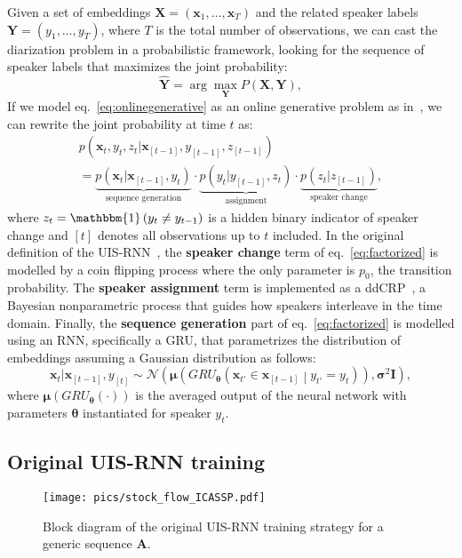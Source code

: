 \documentclass{article}
\def\x{{\mathbf x}}
\def\X{{\mathbf X}}
\def\Y{{\mathbf Y}}
\def\xt1{{\mathbf x}_{\left[t-1\right]}}
\begin{document}
Given a set of embeddings $\X=\left(\x_1,\dots,\x_T\right)$ 
and the related speaker labels $\Y=\left(y_1,\dots,y_T\right)$, where $T$ is the total number of observations, we can cast the diarization problem in a probabilistic framework, looking for the sequence of speaker labels that maximizes the joint probability:
\begin{equation}
\label{eq:onlinegenerative}
    \hat{\Y}=\arg\max_{\Y}P(\X,\Y),
\end{equation}
If we model eq.~\ref{eq:onlinegenerative} as an online generative problem as in~\cite{zhang2019fully}, we can rewrite the joint probability at time $t$ as:
\begin{multline}
\label{eq:factorized}
p(\x_t,y_t,z_t|\xt1,y_{\left[t-1\right]},z_{\left[t-1\right]})\\
=\underbrace{p(\x_t|\xt1,y_t)}_\text{sequence generation}\cdot \underbrace{p(y_t|y_{\left[t-1\right]},z_t)}_\text{assignment} \cdot \underbrace{p(z_t|z_{\left[t-1\right]})}_\text{speaker change},
\end{multline}
where $z_{t}=\mathbbm{1}\left(y_{t} \neq y_{t-1}\right)$ is a hidden binary indicator of speaker change and $\left[t\right]$ denotes all observations up to $t$ included. In the original definition of the UIS-RNN~\cite{zhang2019fully}, the {\bf speaker change} term of eq.~\ref{eq:factorized} is modelled by a coin flipping process where the only parameter is $p_0$, the transition probability. The {\bf speaker assignment} term is implemented as a \ac{ddCRP}~\cite{blei2011distance}, a Bayesian nonparametric process that guides how speakers interleave in the time domain.
Finally, the {\bf sequence generation} part of eq.~\ref{eq:factorized} is modelled using an \ac{RNN}, specifically a \ac{GRU}, that parametrizes the distribution of embeddings assuming a Gaussian distribution as follows:
\begin{equation}
\label{eq:gaussian}
    \x_t|\x_{[t-1]}, y_{[t]}\sim \mathcal{N}\left(\boldsymbol{\mu}\left(GRU_{\boldsymbol{\theta}}\left( \x_{t'}\in\x_{[t-1]} \middle| y_{t'} = y_t\right)\right),{\mathbf \sigma^2\boldsymbol{I}}\right),
\end{equation}
where $\boldsymbol{\mu}\left(GRU_{\boldsymbol{\theta}}\left(\boldsymbol{\cdot}\right) \right)$ is the averaged output of the neural network with parameters $\boldsymbol{\theta}$ instantiated for speaker $y_t$.

\subsection{Original UIS-RNN training}
\begin{figure}[!th]
\centering
  \texttt{[image: pics/stock\_flow\_ICASSP.pdf]}
  \caption{Block diagram of the original UIS-RNN training strategy for a generic sequence $\boldsymbol{A}$.}
  \label{fig:stock_boxes}
\end{figure}
\end{document}
